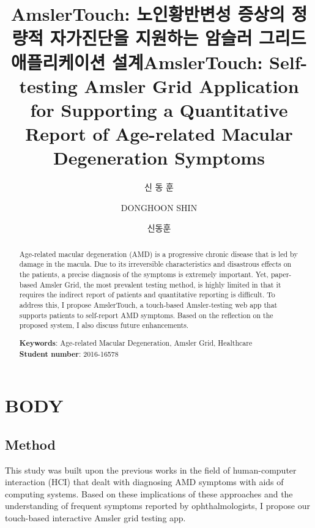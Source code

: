 \documentclass[doctor]{snuece-bs}
\title[korean]{AmslerTouch: 노인황반변성 증상의 정량적 자가진단을 지원하는 암슬러 그리드 애플리케이션 설계}
\title[english]{AmslerTouch: Self-testing Amsler Grid Application for Supporting a Quantitative Report of Age-related Macular Degeneration Symptoms}
\author[korean]{신 동 훈}
\author[english]{DONGHOON SHIN}
\author[nospace]{신동훈}
\begin{document}
\renewcommand{\baselinestretch}{1.5}

\selectfont

\begin{abstract}
	\par
	Age-related macular degeneration (AMD) is a progressive chronic disease that is led by damage in the macula. Due to its irreversible characteristics and disastrous effects on the patients, a precise diagnosis of the symptoms is extremely important. Yet, paper-based Amsler Grid, the most prevalent testing method, is highly limited in that it requires the indirect report of patients and quantitative reporting is difficult. To address this, I propose AmslerTouch, a touch-based Amsler-testing web app that supports patients to self-report AMD symptoms. Based on the reflection on the proposed system, I also discuss future enhancements.
	\vfill
	\begin{minipage}[t][20mm][b]{\textwidth}
		{\bfseries Keywords}: Age-related Macular Degeneration, Amsler Grid, Healthcare\\
		{\bfseries Student number}: 2016-16578\\
	\end{minipage}
	
\end{abstract}

\changepage{5mm}{}{}{}{}{}{}{}{-5mm}

\makelists



\chapter{BODY}

\section{Method}
This study was built upon the previous works in the field of human-computer interaction (HCI) that dealt with diagnosing AMD symptoms with aids of computing systems. Based on these implications of these approaches and the understanding of frequent symptoms reported by ophthalmologists, I propose our touch-based interactive Amsler grid testing app.






\printbibliography
\end{document}
